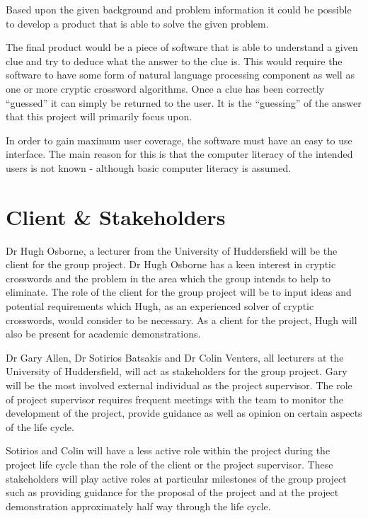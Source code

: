 Based upon the given background and problem information it could be possible to
develop a product that is able to solve the given problem.

The final product would be a piece of software that is able to understand a
given clue and try to deduce what the answer to the clue is. This would require
the software to have some form of natural language processing component as well
as one or more cryptic crossword algorithms. Once a clue has been correctly
``guessed'' it can simply be returned to the user. It is the ``guessing'' of
the answer that this project will primarily focus upon.

In order to gain maximum user coverage, the software must have an easy to use
interface. The main reason for this is that the computer literacy of the
intended users is not known - although basic computer literacy is assumed.


\section{Client \& Stakeholders}

Dr Hugh Osborne, a lecturer from the University of Huddersfield will be the
client for the group project. Dr Hugh Osborne has a keen interest in cryptic
crosswords and the problem in the area which the group intends to help to
eliminate. The role of the client for the group project will be to input ideas
and potential requirements which Hugh, as an experienced solver of cryptic 
crosswords, would consider to be necessary. As a client for the project, Hugh 
will also be present for academic demonstrations.

Dr Gary Allen, Dr Sotirios Batsakis and Dr Colin Venters, all lecturers at the
University of Huddersfield, will act as stakeholders for the group project. Gary
will be the most involved external individual as the project supervisor. The 
role of project supervisor requires frequent meetings with the team to monitor 
the development of the project, provide guidance as well as opinion on certain 
aspects of the life cycle.

Sotirios and Colin will have a less active role within the project during the
project life cycle than the role of the client or the project supervisor.  These
stakeholders will play active roles at particular milestones of the group
project such as providing guidance for the proposal of the project and at the
project demonstration approximately half way through the life cycle.


